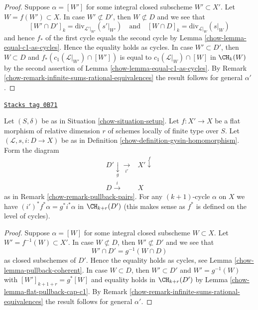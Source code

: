 \begin{proof}

Suppose $\alpha = [W']$ for some integral closed subscheme
$W' \subset X'$. Let $W = f(W') \subset X$. In case $W' \not \subset D'$,
then $W \not \subset D$ and we see that
$$
[W' \cap D']_k = \text{div}_{\mathcal{L}'|_{W'}}({s'|_{W'}})
\quad\text{and}\quad
[W \cap D]_k = \text{div}_{\mathcal{L}|_W}(s|_W)
$$
and hence $f_*$ of the first cycle equals the second cycle by
Lemma \ref{chow-lemma-equal-c1-as-cycles}. Hence the
equality holds as cycles. In case $W' \subset D'$, then
$W \subset D$ and $f_*(c_1(\mathcal{L}|_{W'}) \cap [W'])$
is equal to $c_1(\mathcal{L}|_W) \cap [W]$ in $\CH_k(W)$ by the second
assertion of Lemma \ref{chow-lemma-equal-c1-as-cycles}.
By Remark \ref{chow-remark-infinite-sums-rational-equivalences}
the result follows for general $\alpha'$.
\end{proof}

\begin{lemma}
\label{chow-lemma-gysin-flat-pullback}
\href{https://stacks.math.columbia.edu/tag/0B71}{\texttt{Stacks tag 0B71}}

Let $(S, \delta)$ be as in Situation \ref{chow-situation-setup}. Let $f : X' \to X$
be a flat morphism of relative dimension $r$ of schemes locally of finite type
over $S$. Let $(\mathcal{L}, s, i : D \to X)$ be as in
Definition \ref{chow-definition-gysin-homomorphism}. Form the diagram
$$
\begin{array}{cc}D' \underset{g}{\downarrow}\underset{i'}{\longrightarrow} & X' \overset{f}{\downarrow} \\ D \overset{i}{\longrightarrow} & X\end{array}
$$
as in Remark \ref{chow-remark-pullback-pairs}.
For any $(k + 1)$-cycle $\alpha$ on $X$ we have
$(i')^*f^*\alpha = g^*i^*\alpha$ in $\CH_{k + r}(D')$
(this makes sense as $f^*$ is defined on the level of cycles).
\end{lemma}

\begin{proof}

Suppose $\alpha = [W]$ for some integral closed subscheme
$W \subset X$. Let $W' = f^{-1}(W) \subset X'$. In case $W \not \subset D$,
then $W' \not \subset D'$ and we see that
$$
W' \cap D' = g^{-1}(W \cap D)
$$
as closed subschemes of $D'$. Hence the
equality holds as cycles, see Lemma \ref{chow-lemma-pullback-coherent}.
In case $W \subset D$, then $W' \subset D'$ and $W' = g^{-1}(W)$
with $[W']_{k + 1 + r} = g^*[W]$ and equality holds in
$\CH_{k + r}(D')$ by Lemma \ref{chow-lemma-flat-pullback-cap-c1}.
By Remark \ref{chow-remark-infinite-sums-rational-equivalences}
the result follows for general $\alpha'$.
\end{proof}

